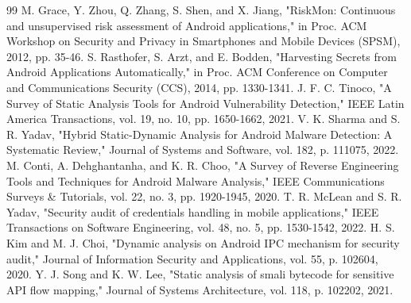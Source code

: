 \documentclass[conference]{
IEEEtran}
\begin{document}
\begin{thebibliography}{99}
 M. Grace, Y. Zhou, Q. Zhang, S. Shen, and X. Jiang, "RiskMon: Continuous and unsupervised risk assessment of Android applications," in Proc. ACM Workshop on Security and Privacy in Smartphones and Mobile Devices (SPSM), 2012, pp. 35-46.
 S. Rasthofer, S. Arzt, and E. Bodden, "Harvesting Secrets from Android Applications Automatically," in Proc. ACM Conference on Computer and Communications Security (CCS), 2014, pp. 1330-1341.
 J. F. C. Tinoco, "A Survey of Static Analysis Tools for Android Vulnerability Detection," IEEE Latin America Transactions, vol. 19, no. 10, pp. 1650-1662, 2021.
 V. K. Sharma and S. R. Yadav, "Hybrid Static-Dynamic Analysis for Android Malware Detection: A Systematic Review," Journal of Systems and Software, vol. 182, p. 111075, 2022.
 M. Conti, A. Dehghantanha, and K. R. Choo, "A Survey of Reverse Engineering Tools and Techniques for Android Malware Analysis," IEEE Communications Surveys & Tutorials, vol. 22, no. 3, pp. 1920-1945, 2020.
 T. R. McLean and S. R. Yadav, "Security audit of credentials handling in mobile applications," IEEE Transactions on Software Engineering, vol. 48, no. 5, pp. 1530-1542, 2022.
 H. S. Kim and M. J. Choi, "Dynamic analysis on Android IPC mechanism for security audit," Journal of Information Security and Applications, vol. 55, p. 102604, 2020.
 Y. J. Song and K. W. Lee, "Static analysis of smali bytecode for sensitive API flow mapping," Journal of Systems Architecture, vol. 118, p. 102202, 2021.
\end{thebibliography}
\end{document}
